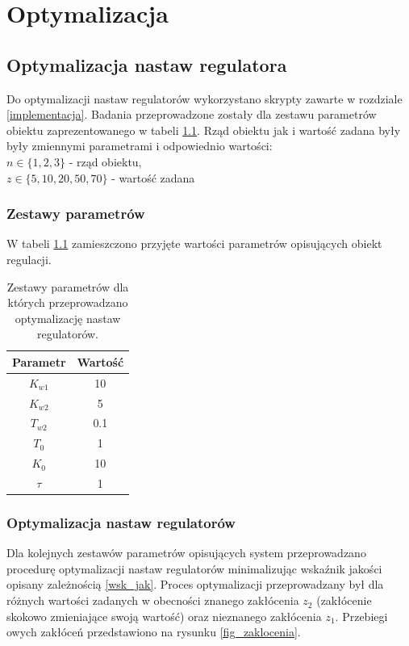 \chapter{Optymalizacja}
 
\section{Optymalizacja nastaw regulatora}

Do optymalizacji nastaw regulatorów wykorzystano skrypty zawarte w rozdziale \ref{implementacja}. Badania przeprowadzone zostały dla zestawu parametrów obiektu zaprezentowanego w tabeli \ref{tab_par}. Rząd obiektu jak i wartość zadana były były zmiennymi parametrami i  odpowiednio wartości: \\
$ n \in \{1,2,3\} $ - rząd obiektu, \\
$ z \in \{ 5,10,20,50,70\}$ - wartość zadana \\ 
\subsection{Zestawy parametrów}
W tabeli \ref{tab_par} zamieszczono przyjęte wartości parametrów opisujących obiekt regulacji.
\begin{table}[]
	\centering
	\caption{Zestawy parametrów dla których przeprowadzano optymalizację nastaw regulatorów.}
	\label{tab_par}
	\begin{tabular}{|c|c|} \hline
	Parametr & Wartość \\ \hline
	$K_{w1}$  & 10 \\ \hline
	$K_{w2}$  & 5 \\ \hline
	$T_{w2}$  & 0.1 \\ \hline
	$T_0$   & 1 \\ \hline
	$K_0$   & 10 \\ \hline
	$\tau$ & 1 \\ \hline
	\end{tabular}
\end{table}


\subsection{Optymalizacja nastaw regulatorów}
Dla kolejnych zestawów parametrów opisujących system przeprowadzano procedurę optymalizacji nastaw regulatorów minimalizując wska\'znik jakości opisany zależnością \ref{wsk_jak}. Proces optymalizacji przeprowadzany był dla różnych wartości zadanych w obecności znanego zakłócenia $z_2$ (zakłócenie skokowo zmieniające swoją wartość) oraz nieznanego zakłócenia $z_1$. Przebiegi owych zakłóceń przedstawiono na rysunku \ref{fig_zaklocenia}. 

